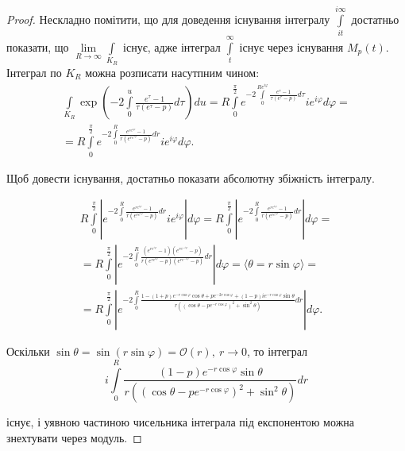 \begin{lem}
\begin{proof}
Нескладно помітити, що для доведення існування інтегралу $\int\limits_{it}^{i\infty}$ достатньо показати, що $\lim\limits_{R \rightarrow \infty} \int\limits_{K_{R}}$ існує, адже інтеграл $\int\limits_{t}^{\infty}$ існує через існування $M_{p}(t)$. Інтеграл по $K_{R}$ можна розписати насутпним чином:
\begin{gather*}
\int\limits_{K_{R}} \exp\left(-2 \int\limits_{0}^{u} \frac{e^\tau -1}{\tau(e^\tau - p)} d\tau\right) du = 
R \int\limits_{0}^{\frac{\pi}{2}} e^{-2 \int\limits_{0}^{Re^{i\varphi}} \frac{e^\tau -1}{\tau(e^\tau - p)} d\tau} i e^{i\varphi}  d\varphi =\\
= R \int\limits_{0}^{\frac{\pi}{2}} e^{-2 \int\limits_{0}^{R} \frac{e^{re^{i\varphi}} -1}{r(e^{re^{i\varphi}} - p)} dr} i e^{i\varphi}  d\varphi.
\end{gather*}

Щоб довести існування, достатньо показати абсолютну збіжність інтегралу.

\begin{equation}
\begin{gathered}
R \int\limits_{0}^{\frac{\pi}{2}} \left| e^{-2 \int\limits_{0}^{R} \frac{e^{re^{i\varphi}} -1}{r(e^{re^{i\varphi}} - p)} dr} i e^{i\varphi} \right| d\varphi = R \int\limits_{0}^{\frac{\pi}{2}} \left| e^{-2 \int\limits_{0}^{R} \frac{e^{re^{i\varphi}} -1}{r(e^{re^{i\varphi}} - p)} dr} \right| d\varphi=\\
=R \int\limits_{0}^{\frac{\pi}{2}} \left| e^{-2 \int\limits_{0}^{R} \frac{(e^{re^{i\varphi}} -1)(e^{re^{-i\varphi}} - p)}{r(e^{re^{i\varphi}} - p)(e^{re^{-i\varphi}} - p)} dr} \right| d\varphi = \langle \theta = r \sin \varphi \rangle = \\
=R \int\limits_{0}^{\frac{\pi}{2}} \left| e^{-2 \int\limits_{0}^{R} \frac{1- (1+p)e^{-r \cos \varphi} \cos \theta + p e^{-2r \cos \varphi} + (1-p)ie^{-r \cos \varphi} \sin \theta}{r((\cos \theta - pe^{-r\cos \varphi})^{2} + \sin^2 \theta)} dr} \right| d\varphi.
\end{gathered}
\end{equation}

Оскільки $\sin \theta = \sin (r \sin \varphi)= \mathcal{O}(r), ~ r \rightarrow 0$, то інтеграл
\begin{equation*}
i \int\limits_{0}^{R} \frac{(1-p)e^{-r \cos \varphi} \sin \theta}{r((\cos \theta - pe^{-r\cos \varphi})^{2} + \sin^2 \theta)} dr
\end{equation*}

існує, і уявною частиною чисельника інтеграла під експонентою можна знехтувати через модуль.


\end{proof}
\end{lem}
